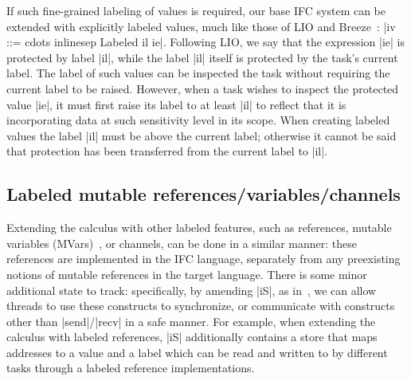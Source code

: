 If such fine-grained labeling of values is required, our base IFC
system can be extended with explicitly labeled
values, much like those of LIO and
Breeze~\cite{lio, Hritcu:2013:YIB:2497621.2498098}: |iv ::= cdots
inlinesep Labeled il ie|.
%
Following LIO, we say that the expression |ie| is protected by label |il|,
while the label |il| itself is protected by the task's current label.
%
%
The label of such values can be inspected the task without
requiring the current label to be raised.
%
However, when a task wishes to inspect the protected value |ie|, it
must first raise its label to at least |il| to reflect that it is
incorporating data at such sensitivity level in its scope.
%
When creating labeled values the label |il| must be above
the current label; otherwise it cannot be said that protection has
been transferred from the current label to |il|.
%

\subsection{Labeled mutable references/variables/channels}
%
Extending the calculus with other labeled features, such as
references, mutable variables (MVars)~\cite{CH96}, or channels,
can be done in a similar manner: these references are implemented
in the IFC language, separately from any preexisting notions of
mutable references in the target language.
%
%
There is some minor additional state to track: specifically, by amending |iS|, as in~\cite{lio,
stefan:addressing-covert}, we can allow threads to use these
constructs to synchronize, or communicate with constructs other than
|send|/|recv| in a safe manner.
%
For example, when extending the calculus with labeled references, |iS|
additionally contains a store that maps addresses to a value
and a label
which can be read and written to by different tasks through a labeled
reference implementations.

